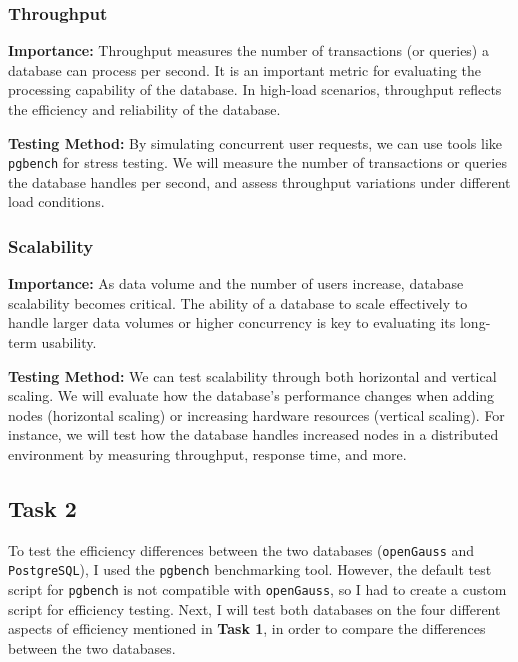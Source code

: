\documentclass[12pt,a4paper,cs4size]{ctexart}
\begin{document}
\subsubsection*{Throughput}

\textbf{Importance:} Throughput measures the number of transactions (or queries) a database can process per second. It is an important metric for evaluating the processing capability of the database. In high-load scenarios, throughput reflects the efficiency and reliability of the database.

\textbf{Testing Method:} By simulating concurrent user requests, we can use tools like \texttt{pgbench} for stress testing. We will measure the number of transactions or queries the database handles per second, and assess throughput variations under different load conditions.

\subsubsection*{Scalability}

\textbf{Importance:} As data volume and the number of users increase, database scalability becomes critical. The ability of a database to scale effectively to handle larger data volumes or higher concurrency is key to evaluating its long-term usability.

\textbf{Testing Method:} We can test scalability through both horizontal and vertical scaling. We will evaluate how the database's performance changes when adding nodes (horizontal scaling) or increasing hardware resources (vertical scaling). For instance, we will test how the database handles increased nodes in a distributed environment by measuring throughput, response time, and more.

\newpage

\subsection*{Task 2}

To test the efficiency differences between the two databases (\texttt{openGauss} and \texttt{PostgreSQL}), I used the \texttt{pgbench} benchmarking tool. However, the default test script for \texttt{pgbench} is not compatible with \texttt{openGauss}, so I had to create a custom script for efficiency testing. Next, I will test both databases on the four different aspects of efficiency mentioned in \textbf{Task 1}, in order to compare the differences between the two databases.
\end{document}
